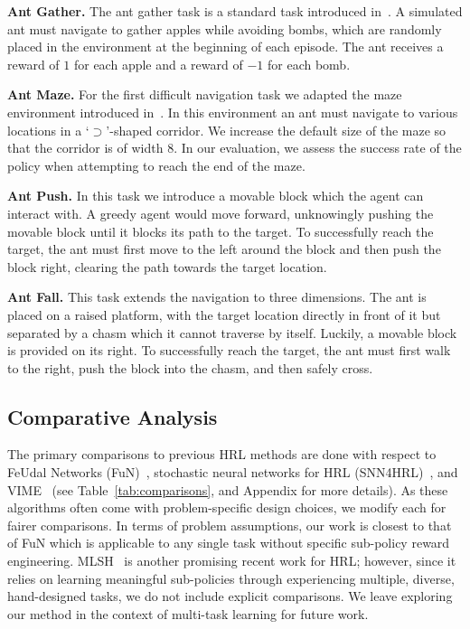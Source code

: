 \documentclass{article}
\begin{document}
\textbf{Ant Gather.}
The ant gather task is a standard task introduced in~\cite{duan2016benchmarking}.  A simulated ant must navigate to gather apples while avoiding bombs, which are randomly placed in the environment at the beginning of each episode.
The ant receives a reward of $1$ for each apple and a reward of $-1$ for each bomb.

\textbf{Ant Maze.}
For the first difficult navigation task we adapted the maze environment introduced in~\cite{duan2016benchmarking}.
In this environment an ant must navigate to various locations in a `$\supset$'-shaped corridor.  We increase the default size of the maze so that the corridor is of width $8$.  
In our evaluation, we assess the success rate of the policy when attempting to reach the end of the maze.

\textbf{Ant Push.}
In this task we introduce a movable block which the agent can interact with.  
A greedy agent would move forward, unknowingly pushing the movable block until it blocks its path to the target.
To successfully reach the target, the ant must first move to the left around the block and then push the block right, clearing the path towards the target location.

\textbf{Ant Fall.}
This task extends the navigation to three dimensions.
The ant is placed on a raised platform, with the target location directly in front of it but separated by a chasm which it cannot traverse by itself.  Luckily, a movable block is provided on its right.  To successfully reach the target, the ant must first walk to the right, push the block into the chasm, and then safely cross.

\subsection{Comparative Analysis}

The primary comparisons to previous HRL methods are done with respect to 
FeUdal Networks (FuN)~\cite{vezhnevets2017feudal}, stochastic neural networks for HRL (SNN4HRL)~\cite{florensa2017stochastic}, and VIME~\cite{houthooft2016vime} (see Table~\ref{tab:comparisons}, and Appendix for more details).
As these algorithms often come with problem-specific design choices, we modify each for fairer comparisons. In terms of problem assumptions, our work is closest to that of FuN which is applicable to any single task without specific sub-policy reward engineering. MLSH~\cite{frans2017meta} is another promising recent work for HRL; however, since it relies on learning meaningful sub-policies through experiencing multiple, diverse, hand-designed tasks, we do not include explicit comparisons.  We leave exploring our method in the context of multi-task learning for future work.
\end{document}
